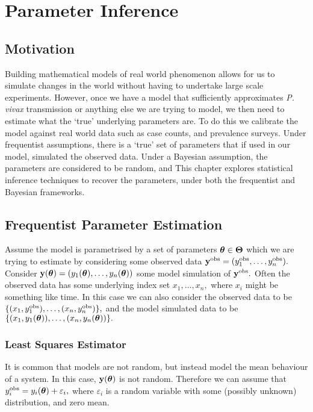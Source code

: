 \chapter{Parameter Inference}

\section{Motivation}

Building mathematical models of real world phenomenon allows for us to
simulate changes in the world without having to undertake large scale
experiments. However, once we have a model that sufficiently approximates
\emph{P. vivax} transmission
or anything else we are trying to model,
we then need to estimate what the `true' underlying parameters are.
To do this we calibrate the model against real world data such as case counts,
and prevalence surveys. Under frequentist assumptions, there is a `true' set of
parameters that if used in our model, simulated the observed data. Under a Bayesian
assumption, the parameters are considered to be random, and
This chapter explores statistical inference techniques to recover the
parameters, under both the frequentist and Bayesian frameworks.

\section{Frequentist Parameter Estimation}

Assume the model is parametrised by a set of parameters
$\bm{\theta} \in \mathbf{\Theta}$ which
we are trying to estimate by considering some observed data
$\mathbf{y}^{\mathrm{obs}} = (y_1^{\mathrm{obs}}, \dots, y_n^{\mathrm{obs}}).$
Consider $\mathbf{y}(\bm{\theta}) = (y_1(\bm{\theta}), \dots, y_n(\bm{\theta}))$
some model simulation of
$\mathbf{y}^{\mathrm{obs}}.$ Often the observed data has some underlying index set
$x_1, \dots, x_n,$ where $x_i$ might be something like time. In this case
we can also consider the observed data to be
$\{(x_1, y_1^{\mathrm{obs}}), \dots, (x_n, y_n^{\mathrm{obs}})\},$ and the
model simulated data to be
$\{(x_1, y_1(\bm{\theta})), \dots, (x_n, y_n(\bm{\theta}))\}.$

\subsection*{Least Squares Estimator}

It is common that models are not random, but instead model the mean behaviour
of a system. In this case, $\mathbf{y}(\bm{\theta})$ is not random. Therefore
we can assume that $y^{\mathrm{obs}}_i = y_i(\bm{\theta}) + \varepsilon_i,$
where $\varepsilon_i$ is a random variable with some (possibly unknown)
distribution, and zero mean.

